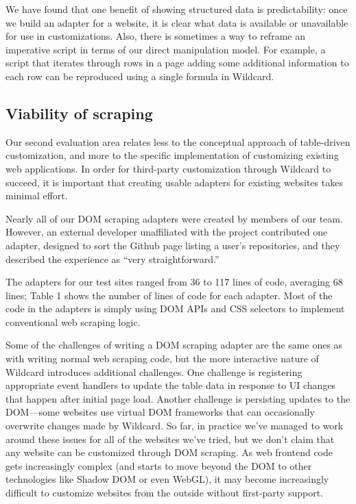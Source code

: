 \documentclass[sigplan,screen,10pt,anonymous,review]{acmart}
\begin{document}
We have found that one benefit of showing structured data is
predictability: once we build an adapter for a website, it is clear what
data is available or unavailable for use in customizations. Also, there
is sometimes a way to reframe an imperative script in terms of our
direct manipulation model. For example, a script that iterates through
rows in a page adding some additional information to each row can be
reproduced using a single formula in Wildcard.

\hypertarget{viability-of-scraping}{%
\subsection{Viability of scraping}\label{viability-of-scraping}}

Our second evaluation area relates less to the conceptual approach of
table-driven customization, and more to the specific implementation of
customizing existing web applications. In order for third-party
customization through Wildcard to succeed, it is important that creating
usable adapters for existing websites takes minimal effort.

Nearly all of our DOM scraping adapters were created by members of our
team. However, an external developer unaffiliated with the project
contributed one adapter, designed to sort the Github page listing a
user's repositories, and they described the experience as ``very
straightforward.''

The adapters for our test sites ranged from 36 to 117 lines of code,
averaging 68 lines; Table 1 shows the number of lines of code for each
adapter. Most of the code in the adapters is simply using DOM APIs and
CSS selectors to implement conventional web scraping logic.

Some of the challenges of writing a DOM scraping adapter are the same
ones as with writing normal web scraping code, but the more interactive
nature of Wildcard introduces additional challenges. One challenge is
registering appropriate event handlers to update the table data in
response to UI changes that happen after initial page load. Another
challenge is persisting updates to the DOM---some websites use virtual
DOM frameworks that can occasionally overwrite changes made by Wildcard.
So far, in practice we've managed to work around these issues for all of
the websites we've tried, but we don't claim that any website can be
customized through DOM scraping. As web frontend code gets increasingly
complex (and starts to move beyond the DOM to other technologies like
Shadow DOM or even WebGL), it may become increasingly difficult to
customize websites from the outside without first-party support.
\end{document}
